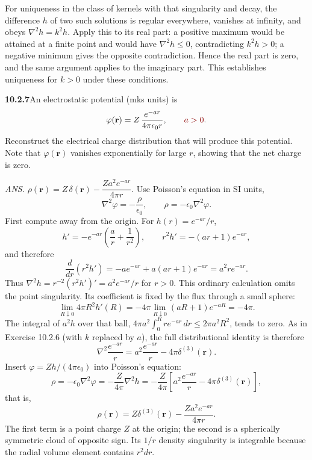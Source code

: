 For uniqueness in the class of kernels with that singularity and decay,
the difference $h$ of two such solutions is regular everywhere,
vanishes at infinity, and obeys $\nabla^2h=k^2h$.
Apply this to its real part: a positive maximum would be attained at
a finite point and would have $\nabla^2h\le0$, contradicting $k^2h>0$;
a negative minimum gives the opposite contradiction. Hence the real
part is zero, and the same argument applies to the imaginary part.
This establishes uniqueness for $k>0$ under these conditions.

\par\bigskip
\noindent\textbf{10.2.7}\quad An electrostatic potential (mks units) is
\[
\varphi(\mathbf{r})=Z\,\frac{e^{-ar}}{4\pi\epsilon_{0}r},
\qquad\erratum{a>0}.
\]
Reconstruct the electrical charge distribution that will produce this
potential. Note that $\varphi(\mathbf{r})$ vanishes exponentially for large
$r$, showing that the net charge is zero.
\par\nobreak\hfill\emph{ANS.}\enspace
$\rho(\mathbf{r})=Z\,\delta(\mathbf{r})-\dfrac{Za^{2}e^{-ar}}{4\pi r}$.
\solution
{}
Use Poisson's equation in SI units,
\[
\nabla^2\varphi=-\frac{\rho}{\epsilon_0},\qquad
\rho=-\epsilon_0\nabla^2\varphi.
\]
First compute away from the origin. For $h(r)=e^{-ar}/r$,
\[
h'=-e^{-ar}\left(\frac a{r}+\frac1{r^2}\right),\qquad
r^2h'=-(ar+1)e^{-ar},
\]
and therefore
\[
\frac d{dr}(r^2h')
=-a e^{-ar}+a(ar+1)e^{-ar}=a^2r e^{-ar}.
\]
Thus $\nabla^2h=r^{-2}(r^2h')'=a^2e^{-ar}/r$ for $r>0$.
This ordinary calculation omits the point singularity. Its coefficient
is fixed by the flux through a small sphere:
\[
\lim_{R\downarrow0}4\pi R^2h'(R)
=-4\pi\lim_{R\downarrow0}(aR+1)e^{-aR}=-4\pi.
\]
The integral of $a^2h$ over that ball,
$4\pi a^2\int_0^Rre^{-ar}\,dr\le2\pi a^2R^2$, tends to zero. As in
Exercise 10.2.6 (with $k$ replaced by $a$), the full distributional
identity is therefore
\[
\nabla^2\frac{e^{-ar}}r
=a^2\frac{e^{-ar}}r-4\pi\delta^{(3)}(\mathbf r).
\]
Insert $\varphi=Zh/(4\pi\epsilon_0)$ into Poisson's equation:
\[
\rho=-\epsilon_0\nabla^2\varphi=-\frac Z{4\pi}\nabla^2h
=-\frac Z{4\pi}\left[a^2\frac{e^{-ar}}r-4\pi\delta^{(3)}(\mathbf r)\right],
\]
that is,
\[
\boxed{\rho(\mathbf r)=Z\delta^{(3)}(\mathbf r)
-\frac{Za^2e^{-ar}}{4\pi r}.}
\]
The first term is a point charge $Z$ at the origin; the second is a
spherically symmetric cloud of opposite sign. Its $1/r$ density
singularity is integrable because the radial volume element contains
$r^2dr$.

